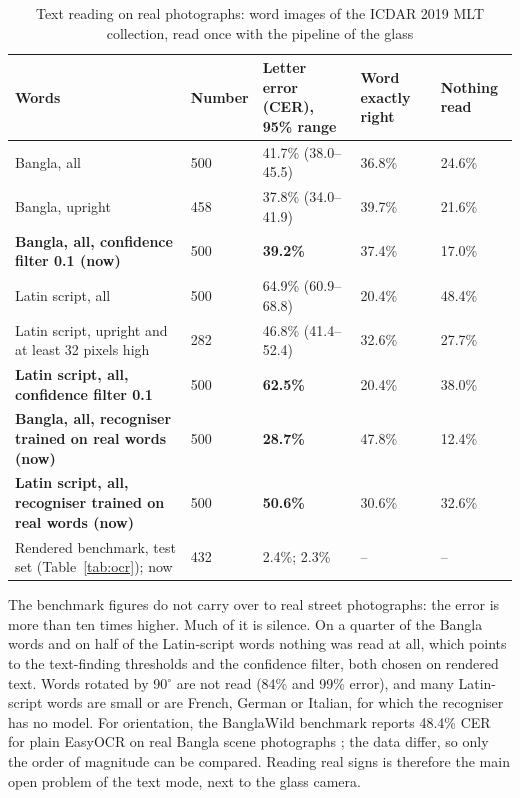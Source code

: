 \begin{table}[!htbp]
\centering
\caption{Text reading on real photographs: word images of the ICDAR 2019 MLT collection, read once with the pipeline of the glass}
\label{tab:ocr_real}
\small
\begin{tabular}{|L{5.0cm}|C{1.5cm}|C{2.6cm}|C{2.3cm}|C{2.1cm}|}
\hline
\textbf{Words} & \textbf{Number} & \textbf{Letter error (CER), 95\% range} & \textbf{Word exactly right} & \textbf{Nothing read} \\ \hline
Bangla, all & 500 & 41.7\% (38.0--45.5) & 36.8\% & 24.6\% \\ \hline
Bangla, upright & 458 & 37.8\% (34.0--41.9) & 39.7\% & 21.6\% \\ \hline
\textbf{Bangla, all, confidence filter 0.1 (now)} & 500 & \textbf{39.2\%} & 37.4\% & 17.0\% \\ \hline
Latin script, all & 500 & 64.9\% (60.9--68.8) & 20.4\% & 48.4\% \\ \hline
Latin script, upright and at least 32 pixels high & 282 & 46.8\% (41.4--52.4) & 32.6\% & 27.7\% \\ \hline
\textbf{Latin script, all, confidence filter 0.1} & 500 & \textbf{62.5\%} & 20.4\% & 38.0\% \\ \hline
\textbf{Bangla, all, recogniser trained on real words (now)} & 500 & \textbf{28.7\%} & 47.8\% & 12.4\% \\ \hline
\textbf{Latin script, all, recogniser trained on real words (now)} & 500 & \textbf{50.6\%} & 30.6\% & 32.6\% \\ \hline
Rendered benchmark, test set (Table~\ref{tab:ocr}); now & 432 & 2.4\%; 2.3\% & -- & -- \\ \hline
\end{tabular}
\end{table}

The benchmark figures do not carry over to real street photographs: the error is more than ten times higher. Much of it is silence. On a quarter of the Bangla words and on half of the Latin-script words nothing was read at all, which points to the text-finding thresholds and the confidence filter, both chosen on rendered text. Words rotated by 90$^\circ$ are not read (84\% and 99\% error), and many Latin-script words are small or are French, German or Italian, for which the recogniser has no model. For orientation, the BanglaWild benchmark reports 48.4\% CER for plain EasyOCR on real Bangla scene photographs \cite{banglawild}; the data differ, so only the order of magnitude can be compared. Reading real signs is therefore the main open problem of the text mode, next to the glass camera.

